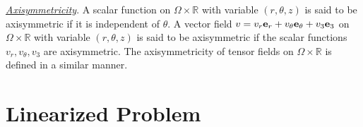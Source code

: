 \documentclass[11pt,a4paper]{article}
\numberwithin{equation}{section}
\newcommand{\R}{\mathbb{R}}
\begin{document}
\smallskip


\noindent
\underline{{\it Axisymmetricity}}. 
A scalar function on $\Omega\times\R$ with variable $(r,\theta,z)$ is said to be axisymmetric if it is independent of $\theta$. A vector field 
$v 
= v_r {\bf e}_r 
+ v_\theta {\bf e}_\theta 
+ v_3 {\bf e}_3$ 
on $\Omega\times\R$ with variable $(r,\theta,z)$ is said to be axisymmetric if the scalar functions $v_r, v_\theta, v_3$ are axisymmetric. The axisymmetricity of tensor fields on $\Omega\times\R$ is defined in a similar manner. 



\section{Linearized Problem}
\label{sec.lin.prob.}
\end{document}
